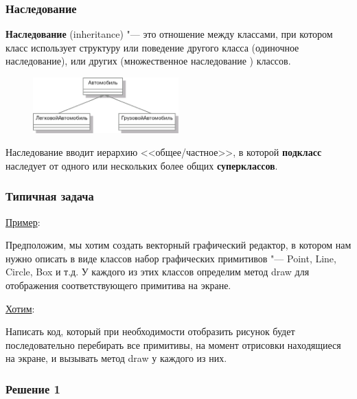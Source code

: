 \documentclass[default]{beamer}
\begin{document}
	\begin{frame}
		\frametitle{Наследование}
		
		\textbf{Наследование} (inheritance) "--- это отношение между классами, при котором класс использует структуру или поведение другого класса (одиночное наследование), или других (множественное наследование ) классов.
		\par\bigskip
		\begin{figure}
			\includegraphics[width=0.5\textwidth]{inheritance}
		\end{figure}
		
		Наследование вводит иерархию <<общее/частное>>, в которой \textbf{подкласс} наследует от одного или нескольких более общих \textbf{суперклассов}.
	\end{frame}
		
	\begin{frame}
		\frametitle{Типичная задача}
		
		\underline{Пример}:
		
		Предположим, мы хотим создать векторный графический редактор, в котором нам нужно описать в виде классов набор графических примитивов "--- Point, Line, Circle, Box и т.д.
		У каждого из этих классов определим метод draw для отображения соответствующего примитива на экране.
		\par\bigskip
		\underline{Хотим}:
		
		Написать код, который при необходимости отобразить рисунок будет последовательно перебирать все примитивы, на момент отрисовки находящиеся на экране, и вызывать метод draw у каждого из них.
	\end{frame}
				
	\begin{frame}
		\frametitle{Решение 1}
		
		\lstSol
	\end{frame}
\end{document}
